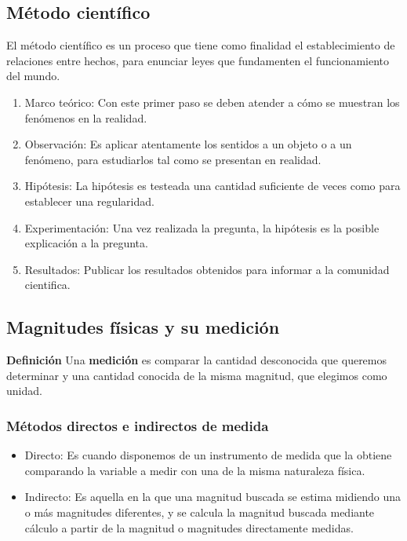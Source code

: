 \documentclass[11pt]{article}
\theoremstyle{definition}
\begin{document}
\subsection{Método científico}

El método científico es un proceso que tiene como finalidad el establecimiento de relaciones entre hechos, para enunciar leyes que fundamenten el funcionamiento del mundo.

\begin{enumerate}
    \item Marco teórico: Con este primer paso se deben atender a cómo se muestran los fenómenos en la realidad.
    \item Observación: Es aplicar atentamente los sentidos a un objeto o a un fenómeno, para estudiarlos tal como se presentan en realidad.
    \item Hipótesis: La hipótesis es testeada una cantidad suficiente de veces como para establecer una regularidad.
    \item Experimentación: Una vez realizada la pregunta, la hipótesis es la posible explicación a la pregunta.
    \item Resultados: Publicar los resultados obtenidos para informar a la comunidad cientifica.
\end{enumerate}


\subsection{Magnitudes físicas y su medición}

\begin{shaded}
\textbf{Definición} \newline
Una \textbf{medición} es comparar la cantidad desconocida que queremos determinar y una cantidad conocida de la misma magnitud, que elegimos como unidad.
\end{shaded}

\subsubsection{Métodos directos e indirectos de medida}

\begin{itemize}
    \item Directo: Es cuando disponemos de un instrumento de medida que la obtiene comparando la variable a medir con una de la misma naturaleza física.
    \item Indirecto:  Es aquella en la que una magnitud buscada se estima midiendo una o más magnitudes diferentes, y se calcula la magnitud buscada mediante cálculo a partir de la magnitud o magnitudes directamente medidas.
\end{itemize}
\end{document}
